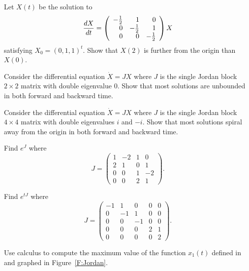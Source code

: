 \begin{exercise} \label{c11.1.3}
Let $X(t)$ be the solution to 
\[
\frac{dX}{dt} = \left(\begin{array}{rrr} 
-\mbox{$\frac{1}{2}$} & 1 & 0 \\ 0 & -\mbox{$\frac{1}{2}$} & 1\\ 0 & 0 & -\mbox{$\frac{1}{2}$}
\end{array}\right)X
\]
satisfying $X_0=(0,1,1)^t$. Show that $X(2)$ is further from the 
origin than $X(0)$.
\end{exercise}

\begin{exercise} \label{c11.1.3A}
Consider the differential equation $\dot{X}=JX$ where $J$ is the single Jordan 
block $2\times 2$ matrix with double eigenvalue $0$.  Show that most 
solutions are unbounded in both forward and backward time.
\end{exercise}


\begin{exercise} \label{c11.1.3B}
Consider the differential equation $\dot{X}=JX$ where $J$ is the single Jordan 
block $4\times 4$ matrix with double eigenvalues $i$ and $-i$.  Show that most 
solutions spiral away from the origin in both forward and backward time.
\end{exercise} 

\begin{exercise} \label{c11.1.3C}
Find $e^J$ where 
\[
J = \left(\begin{array}{rrrr} 
1 & -2 & 1 &  0 \\ 
2 &  1 & 0 &  1 \\
0 &  0 & 1 & -2 \\
0 &  0 & 2 &  1
\end{array}\right).
\]
\end{exercise}

\begin{exercise} \label{c11.1.7}
Find $e^{tJ}$ where 
\[
J = \left(\begin{array}{rrrrr} 
-1 &  1 &  0 &  0 & 0 \\ 
 0 & -1 &  1 &  0 & 0 \\
 0 &  0 & -1 &  0 & 0 \\
 0 &  0 &  0 &  2 & 1 \\
 0 &  0 &  0 &  0 & 2
\end{array}\right).
\]
\end{exercise}

\CEXER

\begin{exercise} \label{c11.1.4}
Use calculus to compute the maximum value of the function $x_1(t)$ 
defined in  and graphed in Figure~\ref{F:Jordan}.
\end{exercise}

